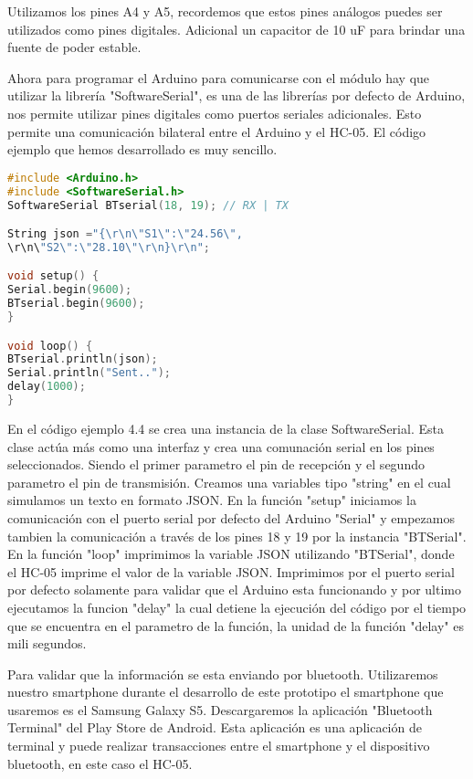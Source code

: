 \par \noindent
Utilizamos los pines A4 y A5, recordemos que estos pines análogos puedes ser utilizados como pines digitales. Adicional un capacitor de 10 uF para brindar una fuente de poder estable.

\par \noindent
Ahora para programar el Arduino para comunicarse con el módulo hay que utilizar la librería "SoftwareSerial", es una de las librerías por defecto de Arduino, nos permite utilizar pines digitales como puertos seriales adicionales. Esto permite una comunicación bilateral entre el Arduino y el HC-05. El código ejemplo que hemos desarrollado es muy sencillo.

\clearpage

\begin{lstlisting}[language=C++, caption={Codigo Ejemplo para módulo HC-05}, captionpos=b]
#include <Arduino.h>
#include <SoftwareSerial.h>
SoftwareSerial BTserial(18, 19); // RX | TX

String json ="{\r\n\"S1\":\"24.56\",
\r\n\"S2\":\"28.10\"\r\n}\r\n";

void setup() {
Serial.begin(9600);
BTserial.begin(9600);  
}

void loop() {
BTserial.println(json); 
Serial.println("Sent.."); 
delay(1000); 
}
\end{lstlisting} 

\par \noindent
En el código ejemplo 4.4 se crea una instancia de la clase SoftwareSerial. Esta clase actúa más como una interfaz y crea una comunación serial en los pines seleccionados. Siendo el primer parametro el pin de recepción y el segundo parametro el pin de transmisión. Creamos una variables tipo "string" en el cual simulamos un texto en formato JSON. En la función "setup" iniciamos la comunicación con el puerto serial por defecto del Arduino "Serial" y empezamos tambien la comunicación a través de los pines 18 y 19 por la instancia "BTSerial". En la función "loop" imprimimos la variable JSON utilizando "BTSerial", donde el HC-05 imprime el valor de la variable JSON. Imprimimos por el puerto serial por defecto solamente para validar que el Arduino esta funcionando y por ultimo ejecutamos la funcion "delay" la cual detiene la ejecución del código por el tiempo que se encuentra en el parametro de la función, la unidad de la función "delay" es mili segundos. 

\par \noindent
Para validar que la información se esta enviando por bluetooth. Utilizaremos nuestro smartphone durante el desarrollo de este prototipo el smartphone que usaremos es el Samsung Galaxy S5. Descargaremos la aplicación "Bluetooth Terminal"\cite{btterminal} del Play Store de Android. Esta aplicación es una aplicación de terminal y puede realizar transacciones entre el smartphone y el dispositivo bluetooth\cite{btterminal}, en este caso el HC-05.


